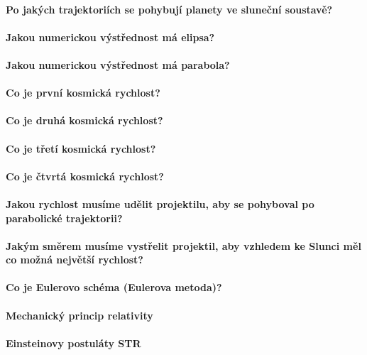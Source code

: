 \documentclass[11pt,a4paper,notitlepage]{article}
\begin{document}
\paragraph{Po jakých trajektoriích se pohybují planety ve sluneční soustavě?}
\paragraph{Jakou numerickou výstřednost má elipsa?}
\paragraph{Jakou numerickou výstřednost má parabola?}
\paragraph{Co je první kosmická rychlost?}
\paragraph{Co je druhá kosmická rychlost?}
\paragraph{Co je třetí kosmická rychlost?}
\paragraph{Co je čtvrtá kosmická rychlost?}
\paragraph{Jakou rychlost musíme udělit projektilu, 
	aby se pohyboval po parabolické trajektorii?}
\paragraph{Jakým směrem musíme vystřelit projektil, 
	aby vzhledem ke Slunci měl co možná největší rychlost?}
\paragraph{Co je Eulerovo schéma (Eulerova metoda)?}
\paragraph{Mechanický princip relativity}
\paragraph{Einsteinovy postuláty STR}
\end{document}
